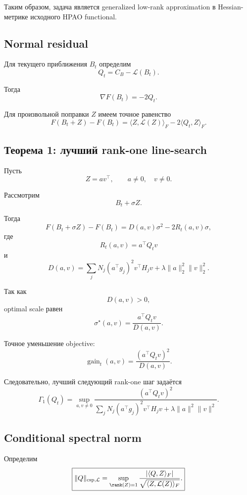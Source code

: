 Таким образом, задача является generalized low-rank approximation
в Hessian-метрике исходного HPAO functional.

\subsection{Normal residual}

Для текущего приближения $B_t$ определим
\[
\boxed{
    Q_t
    =
    C_B-\mathcal L(B_t).
}
\]

Тогда
\[
\boxed{
    \nabla F(B_t)=-2Q_t.
}
\]

Для произвольной поправки $Z$
имеем точное равенство
\[
\boxed{
    F(B_t+Z)-F(B_t)
    =
    \langle Z,\mathcal L(Z)\rangle_F
    -
    2\langle Q_t,Z\rangle_F.
}
\]

\subsection{Теорема 1: лучший rank-one line-search}

Пусть
\[
    Z=av^\top,
    \qquad
    a\neq0,
    \quad
    v\neq0.
\]

Рассмотрим
\[
    B_t+\sigma Z.
\]

Тогда
\[
    F(B_t+\sigma Z)-F(B_t)
    =
    D(a,v)\sigma^2
    -
    2R_t(a,v)\sigma,
\]
где
\[
\boxed{
    R_t(a,v)
    =
    a^\top Q_tv
}
\]
и
\[
\boxed{
    D(a,v)
    =
    \sum_j
    N_j
    (a^\top g_j)^2
    v^\top H_jv
    +
    \lambda
    \|a\|_2^2\|v\|_2^2.
}
\]

Так как
\[
    D(a,v)>0,
\]
optimal scale равен
\[
\boxed{
    \sigma^\star(a,v)
    =
    \frac{
        a^\top Q_tv
    }{
        D(a,v)
    }.
}
\]

Точное уменьшение objective:
\[
\boxed{
    \operatorname{gain}_t(a,v)
    =
    \frac{
        (a^\top Q_tv)^2
    }{
        D(a,v)
    }.
}
\]

Следовательно, лучший следующий rank-one шаг задаётся
\[
\boxed{
    \Gamma_1(Q_t)
    =
    \sup_{a,v\neq0}
    \frac{
        (a^\top Q_tv)^2
    }{
        \sum_j
        N_j
        (a^\top g_j)^2
        v^\top H_jv
        +
        \lambda
        \|a\|^2\|v\|^2
    }.
}
\]

\subsection{Conditional spectral norm}

Определим
\[
\boxed{
    \|Q\|_{\mathrm{csp},\mathcal L}
    =
    \sup_{\rank(Z)=1}
    \frac{
        |\langle Q,Z\rangle_F|
    }{
        \sqrt{
            \langle Z,\mathcal L(Z)\rangle_F
        }
    }.
}
\]

